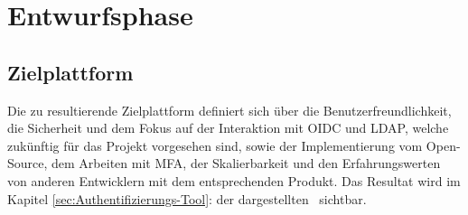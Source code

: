 \section{Entwurfsphase} 
\label{sec:Entwurfsphase}

\subsection{Zielplattform}
\label{sec:Zielplattform}
Die zu resultierende Zielplattform definiert sich über die Benutzerfreundlichkeit, die Sicherheit und dem Fokus auf der Interaktion 
mit \acs{OIDC} und \acs{LDAP}, welche zukünftig für das Projekt vorgesehen sind, sowie der Implementierung vom Open-Source, dem Arbeiten mit MFA, 
der Skalierbarkeit und den Erfahrungswerten von anderen Entwicklern mit dem entsprechenden Produkt. Das Resultat wird im Kapitel 
\ref{sec:Authentifizierungs-Tool}:  der dargestellten~ sichtbar.


